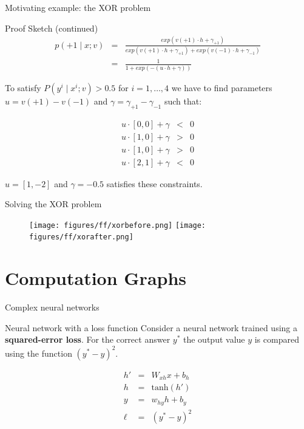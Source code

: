 \begin{frame}{Motivating example: the XOR problem}
\begin{block}{Proof Sketch (continued)}
\begin{eqnarray*}
p(+1 \mid x; v) &=& \frac{exp(v(+1) \cdot h  + \gamma_{+1})}{exp(v(+1) \cdot h  + \gamma_{+1}) + exp(v(-1) \cdot h + \gamma_{-1})} \\
&=& \frac{1}{1 + exp(-(u \cdot h + \gamma))}
\end{eqnarray*}

\pause
To satisfy $P(y^i \mid x^i; v) > 0.5$ for $i = 1,\ldots,4$
we have to find parameters $u = v(+1) - v(-1)$ and $\gamma = \gamma_{+1} - \gamma_{-1}$
such that:

\begin{eqnarray*}
u \cdot [0,0] + \gamma &<& 0 \\
u \cdot [1,0] + \gamma &>& 0 \\
u \cdot [1,0] + \gamma &>& 0 \\
u \cdot [2,1] + \gamma &<& 0
\end{eqnarray*}

$u = [1, -2]$ and $\gamma = -0.5$ satisfies these constraints.
\end{block}
\end{frame}

\begin{frame}{Solving the XOR problem}
\begin{figure}
   \texttt{[image: figures/ff/xorbefore.png]}
   \hfill
   \texttt{[image: figures/ff/xorafter.png]}
\end{figure}
\end{frame}

\section{Computation Graphs}
\frame{\tableofcontents[currentsection]}

\begin{frame}{Complex neural networks}
\begin{block}{Neural network with a loss function}
Consider a neural network trained using a \textbf{squared-error loss}. 
For the correct answer $y^\ast$ the output value $y$ is compared using
the function $(y^\ast - y)^2$.

	\begin{eqnarray*}
		h' &=& W_{xh} x + b_h \\
		h &=& \text{tanh}(h') \\
		y &=& w_{hy} h + b_y \\
		\ell &=& (y^\ast - y)^2
	\end{eqnarray*}
\end{block}

\end{frame}

